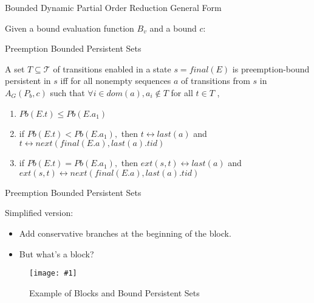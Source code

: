 \documentclass[9pt]{beamer}
\newcommand{\trace}[2]{
\begin{figure}[H]
\centering
\texttt{[image: \#1]}
\caption{#2}
\label{#2}
\end{figure}
}
\begin{document}
\begin{frame}{Bounded Dynamic Partial Order Reduction General Form}

Given a bound evaluation function $B_v$ and a bound $c$:

\begin{figure}
\end{figure}
    
\end{frame}

\begin{frame}{Preemption Bounded Persistent Sets}

\begin{definition}

A set $T \subseteq \mathcal{T}$ of transitions enabled in a state $s=final(E)$
is preemption-bound persistent in $s$ iff for all nonempty
sequences $a$ of transitions from $s$ in $A_G(P_b,c)$ such that
$\forall i \in dom(a), a_i \notin T$ for all $t \in T$ ,

\begin{enumerate}
\item $Pb(E.t) \leq Pb(E.a_1)$
\item if $Pb(E.t)<Pb(E.a_{1}) ,$ then $t \leftrightarrow last(a)$ and $t \leftrightarrow  next(final(E.a), last(a).tid)$
\item if $Pb(E.t)=Pb(E.a_{1}),$ then $ext(s,t) \leftrightarrow last(a)$ and $ext(s,t) \leftrightarrow next(final(E.a), last(a).tid)$
\end{enumerate}

\end{definition}
    
\end{frame}

\begin{frame}{Preemption Bounded Persistent Sets}

Simplified version:

\begin{itemize}[<+->]
   \item Add conservative branches at the beginning of the block.
   \item But what's a block?
\end{itemize}
   \pause
   \trace{../img/bound-persistent-blocks.pdf}{Example of Blocks and Bound Persistent Sets}
\end{frame}
\end{document}
